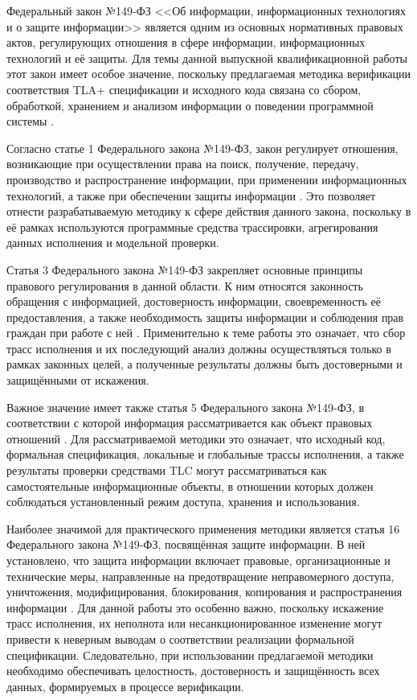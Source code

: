 Федеральный закон №149-ФЗ <<Об информации, информационных технологиях и о
защите информации>> является одним из основных нормативных правовых актов,
регулирующих отношения в сфере информации, информационных технологий и её
защиты. Для темы данной выпускной квалификационной работы этот закон имеет
особое значение, поскольку предлагаемая методика верификации соответствия
TLA+ спецификации и исходного кода связана со сбором, обработкой,
хранением и анализом информации о поведении программной системы
\cite{fz149_info}.

Согласно статье 1 Федерального закона №149-ФЗ, закон регулирует
отношения, возникающие при осуществлении права на поиск, получение,
передачу, производство и распространение информации, при применении
информационных технологий, а также при обеспечении защиты информации
\cite{fz149_info}. Это позволяет отнести разрабатываемую методику к сфере
действия данного закона, поскольку в её рамках используются программные
средства трассировки, агрегирования данных исполнения и модельной
проверки.

Статья 3 Федерального закона №149-ФЗ закрепляет основные принципы
правового регулирования в данной области. К ним относятся законность
обращения с информацией, достоверность информации, своевременность её
предоставления, а также необходимость защиты информации и соблюдения прав
граждан при работе с ней \cite{fz149_info}. Применительно к теме работы
это означает, что сбор трасс исполнения и их последующий анализ должны
осуществляться только в рамках законных целей, а полученные результаты
должны быть достоверными и защищёнными от искажения.

Важное значение имеет также статья 5 Федерального закона №149-ФЗ, в
соответствии с которой информация рассматривается как объект правовых
отношений \cite{fz149_info}. Для рассматриваемой методики это означает,
что исходный код, формальная спецификация, локальные и глобальные трассы
исполнения, а также результаты проверки средствами TLC могут
рассматриваться как самостоятельные информационные объекты, в отношении
которых должен соблюдаться установленный режим доступа, хранения и
использования.

Наиболее значимой для практического применения методики является статья 16
Федерального закона №149-ФЗ, посвящённая защите информации. В ней
установлено, что защита информации включает правовые, организационные и
технические меры, направленные на предотвращение неправомерного доступа,
уничтожения, модифицирования, блокирования, копирования и распространения
информации \cite{fz149_info}. Для данной работы это особенно важно,
поскольку искажение трасс исполнения, их неполнота или несанкционированное
изменение могут привести к неверным выводам о соответствии реализации
формальной спецификации. Следовательно, при использовании предлагаемой
методики необходимо обеспечивать целостность, достоверность и
защищённость всех данных, формируемых в процессе верификации.

